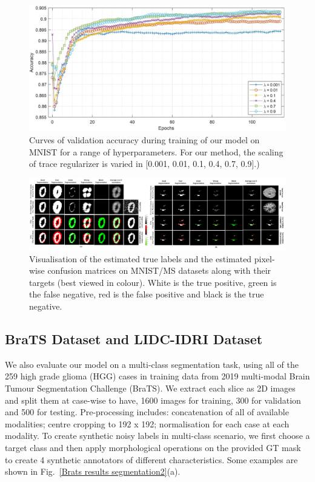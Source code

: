 \begin{figure}[t!]
        \center
        \includegraphics[width=\linewidth]{chapter_8_neurips/picture4.jpg}
        \caption{Curves of validation accuracy during training of our model on MNIST for a range of hyperparameters. For our method, the scaling of trace regularizer is varied in [0.001, 0.01, 0.1, 0.4, 0.7, 0.9].)}
        \label{Paramater lambda}
\end{figure}
    

\begin{figure}[t!]
    \centering
    \includegraphics[width=\linewidth]{chapter_8_neurips/picture7.jpg}
    \caption{\footnotesize Visualisation of the estimated true labels and the estimated pixel-wise confusion matrices on MNIST/MS datasets along with their targets (best viewed in colour). White is the true positive, green is the false negative, red is the false positive and black is the true negative.}
    \label{CMs of MNIST and MS}
\end{figure}

\clearpage
\subsection{BraTS Dataset and LIDC-IDRI Dataset}
We also evaluate our model on a multi-class segmentation task, using all of the 259 high grade glioma (HGG) cases in training data from 2019 multi-modal Brain Tumour Segmentation Challenge (BraTS). We extract each slice as 2D images and split them at case-wise to have, 1600 images for training, 300 for validation and 500 for testing. Pre-processing includes: concatenation of all of available modalities; centre cropping to 192 x 192; normalisation for each case at each modality. To create synthetic noisy labels in multi-class scenario, we first choose a target class and then apply morphological operations on the provided GT mask to create 4 synthetic annotators of different characteristics. Some examples are shown in Fig.~\ref{Brats results segmentation2}(a). 

